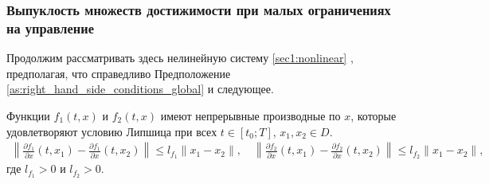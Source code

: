 \documentclass[../main.tex]{subfiles}
\begin{document}
	\subsubsection{Выпуклость множеств достижимости при малых ограничениях на управление}
	
	Продолжим рассматривать здесь нелинейную систему \eqref{sec1:nonlinear} , предполагая, что справедливо Предположение \ref{as:right_hand_side_conditions_global} и следующее.
	 \begin{assumption}\label{as:right_hand_side_diff_lip}
		Функции $f_1(t,x)$ и $f_2(t,x)$ имеют непрерывные производные по $x$, которые удовлетворяют условию Липшица при всех $t \in [t_0;T]$, $x_1, x_2 \in D$.
		\begin{gather*}
			\left\| \frac{\partial f_1}{\partial x}(t,x_1) - \frac{\partial f_1}{\partial x}(t,x_2) \right\| \leqslant l_{f_1} \| x_1 - x_2\|, \quad 	\left\| \frac{\partial f_2}{\partial x}(t,x_1) - \frac{\partial f_2}{\partial x}(t,x_2) \right\| \leqslant l_{f_2} \| x_1 - x_2\|,
		\end{gather*}
		где $l_{f_1} > 0$ и $l_{f_2} > 0$.
	\end{assumption}
	
\end{document}
